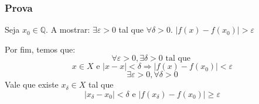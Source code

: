 \documentclass[12pt]{article}
\begin{document}
    \subsubsection*{Prova}
    Seja $x_0 \in \mathbb{Q}$. A mostrar: $\exists \varepsilon > 0$ tal que $\forall \delta >0$. $|f(x) - f(x_0)| > \varepsilon$

    Por fim, temos que:
    \begin{equation*}
        \forall \varepsilon>0, \exists \delta>0 \text { tal que }
\end{equation*}
\begin{equation*}
    x \in X \text{ e }|x-x|<\delta \Rightarrow|f(x)-f(x_0)|<\varepsilon 
\end{equation*}
\begin{equation*}
    \exists \varepsilon>0, \forall \delta>0
\end{equation*}
Vale que existe $x_\delta \in X$ tal que 
\begin{equation*}
    \left|x_\delta-x_0\right|<\delta \text { e }\left|f\left(x_\delta\right)-f\left(x_0\right)\right| \geqslant \varepsilon
\end{equation*}
\end{document}
